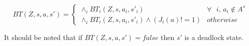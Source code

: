 \begin{equation*}
BT(Z,s,a,s')=
\begin{cases}
\wedge _ i BT_i(Z,s,a_i,s'_i) &  \forall \text{ } i \text{, } a_i \notin A^s \\
\wedge _ i BT_i(Z,s,a_i,s'_i) \wedge (J_i(a) != 1 )  & otherwise
\end{cases}	
\end{equation*}


It should be noted that if $BT(Z,s,a,s')=false$ then  $s'$ is a deadlock state.






